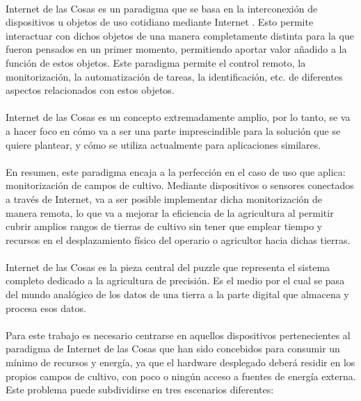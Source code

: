 \documentclass[../../memoria.tex]{subfiles}
\begin{document}
\paragraph{}
Internet de las Cosas es un paradigma que se basa en la interconexión de dispositivos u objetos de uso cotidiano mediante Internet \cite{iotwiki}. Esto permite interactuar con dichos objetos de una manera completamente distinta para la que fueron pensados en un primer momento, permitiendo aportar valor añadido a la función de estos objetos. Este paradigma permite el control remoto, la monitorización, la automatización de tareas, la identificación, etc. de diferentes aspectos relacionados con estos objetos.

\paragraph{}
Internet de las Cosas es un concepto extremadamente amplio, por lo tanto, se va a hacer foco en cómo va a ser una parte imprescindible para la solución que se quiere plantear, y cómo se utiliza actualmente para aplicaciones similares.

\paragraph{}
En resumen, este paradigma encaja a la perfección en el caso de uso que aplica: monitorización de campos de cultivo. Mediante dispositivos o sensores conectados a través de Internet, va a ser posible implementar dicha monitorización de manera remota, lo que va a mejorar la eficiencia de la agricultura al permitir cubrir amplios rangos de tierras de cultivo sin tener que emplear tiempo y recursos en el desplazamiento físico del operario o agricultor hacia dichas tierras.

\paragraph{}
Internet de las Cosas es la pieza central del puzzle que representa el sistema completo dedicado a la agricultura de precisión. Es el medio por el cual se pasa del mundo analógico de los datos de una tierra a la parte digital que almacena y procesa esos datos.

\paragraph{}
Para este trabajo es necesario centrarse en aquellos dispositivos pertenecientes al paradigma de Internet de las Cosas que han sido concebidos para consumir un mínimo de recursos y energía, ya que el hardware desplegado deberá residir en los propios campos de cultivo, con poco o ningún acceso a fuentes de energía externa. Este problema puede subdividirse en tres escenarios diferentes:
\end{document}
